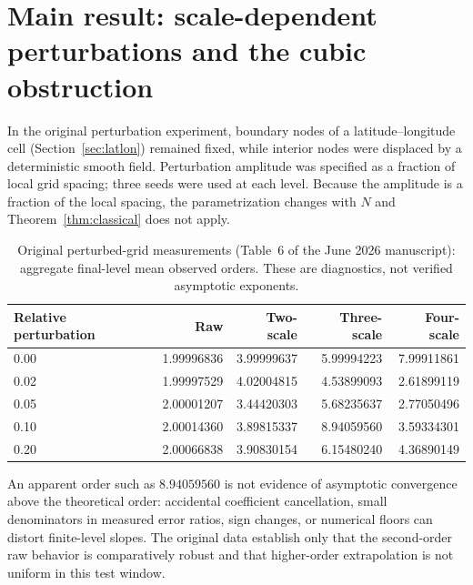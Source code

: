 \documentclass[11pt]{article}
\theoremstyle{remark}
\begin{document}
\section{Main result: scale-dependent perturbations and the cubic obstruction}\label{sec:perturb}
In the original perturbation experiment, boundary nodes of a latitude--longitude cell
(Section~\ref{sec:latlon}) remained
fixed, while interior nodes were displaced by a deterministic smooth field. Perturbation
amplitude was specified as a fraction of local grid spacing; three seeds were used at each
level. Because the amplitude is a fraction of the local spacing, the parametrization changes
with $N$ and Theorem~\ref{thm:classical} does not apply.

\begin{table}[ht]
\centering
\begin{tabular}{lrrrr}
\toprule
Relative perturbation & Raw & Two-scale & Three-scale & Four-scale\\
\midrule
0.00 & 1.99996836 & 3.99999637 & 5.99994223 & 7.99911861\\
0.02 & 1.99997529 & 4.02004815 & 4.53899093 & 2.61899119\\
0.05 & 2.00001207 & 3.44420303 & 5.68235637 & 2.77050496\\
0.10 & 2.00014360 & 3.89815337 & 8.94059560 & 3.59334301\\
0.20 & 2.00066838 & 3.90830154 & 6.15480240 & 4.36890149\\
\bottomrule
\end{tabular}
\caption{Original perturbed-grid measurements (Table~6 of the June 2026 manuscript):
aggregate final-level mean observed orders. These are diagnostics, not verified asymptotic
exponents.}\label{tab:perturb}
\end{table}

An apparent order such as $8.94059560$ is not evidence of asymptotic convergence above the
theoretical order: accidental coefficient cancellation, small denominators in measured error
ratios, sign changes, or numerical floors can distort finite-level slopes. The original data
establish only that the second-order raw behavior is comparatively robust and that
higher-order extrapolation is not uniform in this test window.
\end{document}
